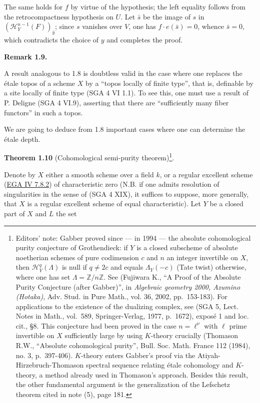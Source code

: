 \documentclass[
  11pt,
  a4paper,
]{book}
\begin{document}
The same holds for \(f\) by virtue of the hypothesis; the left equality
follows from the retrocompactness hypothesis on \(U\). Let \(\bar{s}\)
be the image of \(s\) in \((\mathcal{H}^{n-1}_{Y}(F))_{\bar{y}}\); since
\(s\) vanishes over \(V\), one has \(f \cdot e(\bar{s}) = 0\), whence
\(\bar{s} = 0\), which contradicts the choice of \(y\) and completes the
proof.

\textbf{Remark 1.9.}

A result analogous to 1.8 is doubtless valid in the case where one
replaces the étale topos of a scheme \(X\) by a ``topos locally of
finite type'', that is, definable by a site locally of finite type (SGA
4 VI 1.1). To see this, one must use a result of P. Deligne (SGA 4
VI.9), asserting that there are ``sufficiently many fiber functors'' in
such a topos.

We are going to deduce from 1.8 important cases where one can determine
the étale depth.

\textbf{Theorem 1.10} (Cohomological semi-purity theorem)\footnote{Editors'
  note: Gabber proved since --- in 1994 --- the absolute cohomological
  purity conjecture of Grothendieck: if \(Y\) is a closed subscheme of
  absolute noetherian schemes of pure codimension \(c\) and \(n\) an
  integer invertible on \(X\), then \(\mathcal{H}^{q}_{Y}(\Lambda)\) is
  null if \(q \neq 2c\) and equals \(\Lambda_{Y}(-c)\) (Tate twist)
  otherwise, where one has set \(\Lambda = \mathbb{Z}/n\mathbb{Z}\). See
  (Fujiwara K., ``A Proof of the Absolute Purity Conjecture (after
  Gabber)'', in \emph{Algebraic geometry 2000, Azumino (Hotaka)}, Adv.
  Stud. in Pure Math., vol. 36, 2002, pp.~153-183). For applications to
  the existence of the dualizing complex, see (SGA 5, Lect. Notes in
  Math., vol.~589, Springer-Verlag, 1977, p.~1672), exposé 1 and loc.
  cit., §8. This conjecture had been proved in the case
  \(n = \ell^{\nu}\) with \(\ell\) prime invertible on \(X\)
  sufficiently large by using \(K\)-theory crucially (Thomason R.W.,
  ``Absolute cohomological purity'', Bull. Soc. Math. France 112 (1984),
  no. 3, p.~397-406). \(K\)-theory enters Gabber's proof via the
  Atiyah-Hirzebruch-Thomason spectral sequence relating étale cohomology
  and \(K\)-theory, a method already used in Thomason's approach.
  Besides this result, the other fundamental argument is the
  generalization of the Lefschetz theorem cited in note (5), page 181.}.

Denote by \(X\) either a smooth scheme over a field \(k\), or a regular
excellent scheme
(\href{https://jcreinhold.github.io/ega/iv/19-ch4-07-noetherian-completion.html\#78-excellent-rings}{EGA
IV 7.8.2}) of characteristic zero (N.B. if one admits resolution of
singularities in the sense of (SGA 4 XIX), it suffices to suppose, more
generally, that \(X\) is a regular excellent scheme of equal
characteristic). Let \(Y\) be a closed part of \(X\) and \(L\) the set
\end{document}

